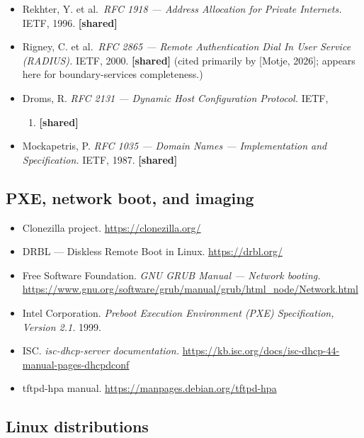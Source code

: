 \begin{itemize}
\tightlist
\item
  Rekhter, Y. et al.~\emph{RFC 1918 --- Address Allocation for Private
  Internets.} IETF, 1996. \textbf{{[}shared{]}}
\item
  Rigney, C. et al.~\emph{RFC 2865 --- Remote Authentication Dial In
  User Service (RADIUS).} IETF, 2000. \textbf{{[}shared{]}} (cited
  primarily by {[}Motje, 2026{]}; appears here for boundary-services
  completeness.)
\item
  Droms, R. \emph{RFC 2131 --- Dynamic Host Configuration Protocol.}
  IETF,

  \begin{enumerate}
  \def\labelenumi{\arabic{enumi}.}
  \setcounter{enumi}{1996}
  \tightlist
  \item
    \textbf{{[}shared{]}}
  \end{enumerate}
\item
  Mockapetris, P. \emph{RFC 1035 --- Domain Names --- Implementation and
  Specification.} IETF, 1987. \textbf{{[}shared{]}}
\end{itemize}

\hypertarget{pxe-network-boot-and-imaging}{%
\subsection{PXE, network boot, and
imaging}\label{pxe-network-boot-and-imaging}}

\begin{itemize}
\tightlist
\item
  Clonezilla project. \url{https://clonezilla.org/}
\item
  DRBL --- Diskless Remote Boot in Linux. \url{https://drbl.org/}
\item
  Free Software Foundation. \emph{GNU GRUB Manual --- Network booting.}
  \url{https://www.gnu.org/software/grub/manual/grub/html_node/Network.html}
\item
  Intel Corporation. \emph{Preboot Execution Environment (PXE)
  Specification, Version 2.1.} 1999.
\item
  ISC. \emph{isc-dhcp-server documentation.}
  \url{https://kb.isc.org/docs/isc-dhcp-44-manual-pages-dhcpdconf}
\item
  tftpd-hpa manual. \url{https://manpages.debian.org/tftpd-hpa}
\end{itemize}

\hypertarget{linux-distributions}{%
\subsection{Linux distributions}\label{linux-distributions}}

